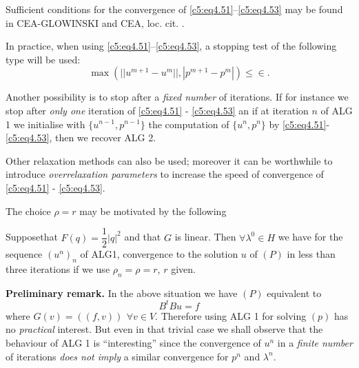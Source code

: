 Sufficient conditions for the convergence of
\eqref{c5:eq4.51}--\eqref{c5:eq4.53} may be found in CEA-GLOWINSKI and
CEA, loc. cit. . 

In practice, when using \eqref{c5:eq4.51}--\eqref{c5:eq4.53}, a
stopping test of the following type will be used: 
\begin{equation}
\max (|| u^{m+1} - u^m || , | p^{m+1} - p^m |) \leq
\in.\tag{4.54}\label{c5:eq4.54}   
\end{equation}
 
 Another possibility is to stop after a \textit{fixed number} of
 iterations. If for instance we stop after \textit{only one} iteration
 of \eqref{c5:eq4.51} - \eqref{c5:eq4.53} an if at iteration $n$ of
 ALG 1 we initialise with $\{u^{n-1}, p^{n-1} \}$ the computation of
 $\{u^n, p^n\}$ by \eqref{c5:eq4.51}-\eqref{c5:eq4.53}, then we
 recover ALG 2. 
 
 \begin{remark}\label{c5:rem4.1}%
Other relaxation methods can also be used; moreover it can be
worthwhile to introduce {\em overrelaxation parameters} to increase
the speed of convergence of \eqref{c5:eq4.51} - \eqref{c5:eq4.53}. 
 \end{remark} 
 
 \begin{remark}\label{c5:rem4.2}%
The choice $\rho = r$ may be motivated by the following 
 \end{remark}  
 
\begin{proposition}\label{c5:prop4.1}%
Suppose\pageoriginale  that $F(q) = \dfrac{1}{2}|q|^2$ and that $G$ is
linear. Then $\forall \lambda^0 \in H$ we have for the sequence
$(u^n)_n $ of ALG1,  convergence to the solution $u$ of $(P)$ in less
than three iterations if we use $\rho_n = \rho = r$, $r$ given.  

{\bf Preliminary remark. } In the above situation we have $(P)$ equivalent to 
\begin{equation}
B^t B u = f 
\end{equation}
where $G(v)= ((f, v)) ~\, \forall v \in  V$.  Therefore using ALG  1 for
solving $(p)$ has no {\em practical} interest.  But even in that
trivial case we shall observe that the behaviour of ALG 1 is
``interesting'' since the convergence of $u^n$ in a {\em finite
  number} of iterations {\em does not imply} a similar convergence for
$p^n$ and $\lambda^n$.  
\end{proposition}

